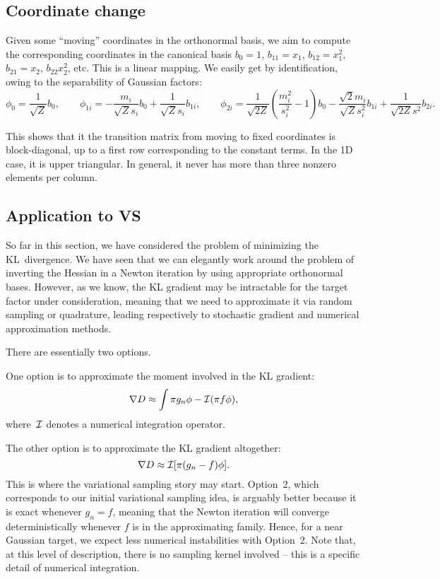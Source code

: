 \documentclass{article}
\begin{document}
\subsection{Coordinate change}

Given some ``moving'' coordinates in the orthonormal basis, we aim to compute the corresponding coordinates in the canonical basis $b_0=1$, $b_{11}=x_1$, $b_{12}=x_1^2$, $b_{21}=x_2$, $b_{22}x_2^2$, etc. This is a linear mapping. We easily get by identification, owing to the separability of Gaussian factors:
$$
\phi_0 =
\frac{1}{\sqrt{Z}} b_0,
\qquad
\phi_{1i} =
-\frac{m_i}{\sqrt{Z}s_i} b_0
+ \frac{1}{\sqrt{Z}s_i} b_{1i},
\qquad
\phi_{2i} =
\frac{1}{\sqrt{2Z}} \left(\frac{m_i^2}{s_i^2} - 1\right) b_0
- \frac{\sqrt{2}m_i}{\sqrt{Z}s_i^2} b_{1i}
+ \frac{1}{\sqrt{2Z}s^2} b_{2i}.
$$

This shows that it the transition matrix from moving to fixed coordinates is block-diagonal, up to a first row corresponding to the constant terms. In the 1D case, it is upper triangular. In general, it never has more than three nonzero elements per column.




\subsection{Application to VS}

So far in this section, we have considered the problem of minimizing the KL~divergence. We have seen that we can elegantly work around the problem of inverting the Hessian in a Newton iteration by using appropriate orthonormal bases. However, as we know, the KL gradient may be intractable for the target factor under consideration, meaning that we need to approximate it via random sampling or quadrature, leading respectively to stochastic gradient and numerical approximation methods.

There are essentially two options.

One option is to approximate the moment involved in the KL gradient:
$$
\nabla D \approx \int \pi g_n\phi - {\cal I}(\pi f \phi),
$$
where~${\cal I}$ denotes a numerical integration operator.

The other option is to approximate the KL gradient altogether:
$$
\nabla D \approx {\cal I}[\pi(g_n - f)\phi].
$$
This is where the variational sampling story may start. Option~2, which corresponds to our initial variational sampling idea, is arguably better because it is exact whenever $g_n=f$, meaning that the Newton iteration will converge deterministically whenever $f$ is in the approximating family. Hence, for a near Gaussian target, we expect less numerical instabilities with Option~2. Note that, at this level of description, there is no sampling kernel involved -- this is a specific detail of numerical integration.
\end{document}
